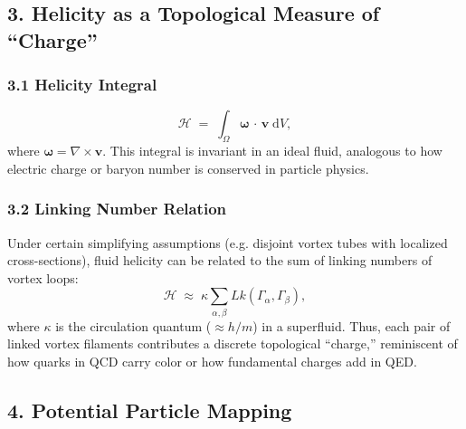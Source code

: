 \documentclass[aps,preprint,superscriptaddress]{revtex4-2}
\begin{document}
    \subsection*{3. Helicity as a Topological Measure of “Charge”}

    \subsubsection*{3.1 Helicity Integral}

    \[
        \mathcal{H}
        \;=\;
        \int_{\Omega}
        \boldsymbol{\omega}\,\cdot\,\mathbf{v}\;\mathrm{d}V,
    \]
    where \(\boldsymbol{\omega} = \nabla \times \mathbf{v}\). This integral is invariant in an ideal fluid, analogous to how electric charge or baryon number is conserved in particle physics.

    \subsubsection*{3.2 Linking Number Relation}

    Under certain simplifying assumptions (e.g. disjoint vortex tubes with localized cross-sections), fluid helicity can be related to the sum of linking numbers of vortex loops:
    \[
        \mathcal{H}
        \;\approx\;
        \kappa
        \sum_{\alpha,\beta} Lk(\Gamma_\alpha, \Gamma_\beta),
    \]
    where \(\kappa\) is the circulation quantum (\(\approx h/m\)) in a superfluid. Thus, each pair of linked vortex filaments contributes a discrete topological “charge,” reminiscent of how quarks in QCD carry color or how fundamental charges add in QED.

    \subsection*{4. Potential Particle Mapping}
\end{document}
